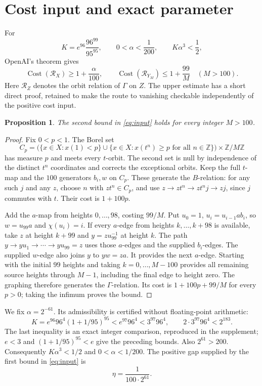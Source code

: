 \documentclass[11pt]{article}
\newcommand{\Cost}{\operatorname{Cost}}
\newcommand{\RR}{\mathcal R}
\newcommand{\ZZ}{\mathbb Z}
\newtheorem{proposition}[theorem]{Proposition}
\theoremstyle{remark}\newtheorem{remark}[theorem]{Remark}
\begin{document}
\section{Cost input and exact parameter}

For
\[
 K=e^{96}\frac{96^{99}}{95^{95}},\qquad
 0<\alpha<\frac1{200},\qquad K\alpha^3<\frac12,
\]
OpenAI's theorem gives
\begin{equation}\label{eq:input}
 \Cost(\RR_X)\geq1+\frac{\alpha}{100},\qquad
 \Cost(\RR_{Y_M})\leq1+\frac{99}{M}\quad(M>100).
\end{equation}
Here $\RR_Z$ denotes the orbit relation of $\Gamma$ on $Z$. The upper estimate has a short direct proof, retained to make the route to vanishing checkable independently of the positive cost input.

\begin{proposition}\label{prop:upper}
The second bound in \eqref{eq:input} holds for every integer $M>100$.
\end{proposition}
\begin{proof}
Fix $0<p<1$. The Borel set
\[
 C_p=\bigl(\{x\in X:x(1)<p\}\cup
 \{x\in X:x(t^n)\geq p\text{ for all }n\in\ZZ\}\bigr)
       \times\ZZ/M\ZZ
\]
has measure $p$ and meets every $t$-orbit. The second set is null by independence of the distinct $t^n$ coordinates and corrects the exceptional orbits. Keep the full $t$-map and the $100$ generators $b_i,w$ on $C_p$. These generate the $B$-relation: for any such $j$ and any $z$, choose $n$ with $zt^n\in C_p$, and use $z\to zt^n\to zt^nj\to zj$, since $j$ commutes with $t$. Their cost is $1+100p$.

Add the $a$-map from heights $0,\ldots,98$, costing $99/M$. Put $u_0=1$, $u_i=u_{i-1}ab_i$, so $w=u_{99}a$ and $\chi(u_i)=i$. If every $a$-edge from heights $k,\ldots,k+98$ is available, take $z$ at height $k+99$ and $y=zu_{99}^{-1}$ at height $k$. The path $y\to yu_1\to\cdots\to yu_{99}=z$ uses those $a$-edges and the supplied $b_i$-edges. The supplied $w$-edge also joins $y$ to $yw=za$. It provides the next $a$-edge. Starting with the initial $99$ heights and taking $k=0,\ldots,M-100$ provides all remaining source heights through $M-1$, including the final edge to height zero. The graphing therefore generates the $\Gamma$-relation. Its cost is $1+100p+99/M$ for every $p>0$; taking the infimum proves the bound.
\end{proof}

We fix $\alpha=2^{-61}$. Its admissibility is certified without floating-point arithmetic:
\begin{equation}\label{eq:certificate}
 K=e^{96}96^4(1+1/95)^{95}<e^{97}96^4<3^{97}96^4,
 \qquad 2\cdot3^{97}96^4<2^{183}.
\end{equation}
The last inequality is an exact integer comparison, reproduced in the supplement; $e<3$ and $(1+1/95)^{95}<e$ give the preceding bounds. Also $2^{61}>200$. Consequently $K\alpha^3<1/2$ and $0<\alpha<1/200$. The positive gap supplied by the first bound in \eqref{eq:input} is
\[
 \eta=\frac1{100\cdot2^{61}}.
\]
\end{document}
